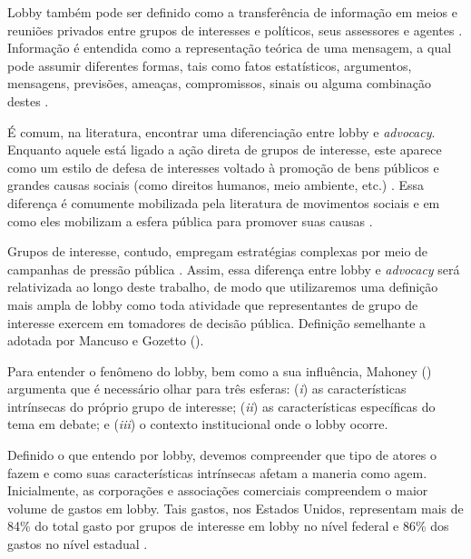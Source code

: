 Lobby também pode ser definido como a transferência de informação em meios e reuniões privados entre grupos de interesses e políticos, seus assessores e agentes \cite{de_figueiredo_advancing_2014}. Informação é entendida como a representação teórica de uma mensagem, a qual pode assumir diferentes formas, tais como fatos estatísticos, argumentos, mensagens, previsões, ameaças, compromissos, sinais ou alguma combinação destes \cite{de_figueiredo_advancing_2014}.

É comum, na literatura, encontrar uma diferenciação entre lobby e \textit{advocacy}. Enquanto aquele está ligado a ação direta de grupos de interesse, este aparece como um estilo de defesa de interesses voltado à promoção de bens públicos e grandes causas sociais (como direitos humanos, meio ambiente, etc.) \cite{mancuso2018}. Essa diferença é comumente mobilizada pela literatura de movimentos sociais e em como eles mobilizam a esfera pública para promover suas causas \cite{van2024rise}.

Grupos de interesse, contudo, empregam estratégias complexas  por meio de campanhas de pressão pública \cite{hall2012targeted}. Assim, essa diferença entre lobby e \textit{advocacy} será relativizada ao longo deste trabalho, de modo que utilizaremos uma definição mais ampla de lobby como toda atividade que representantes de grupo de interesse exercem em tomadores de decisão pública. Definição semelhante a adotada por Mancuso e Gozetto (\citeyear{mancuso2018}).

Para entender o fenômeno do lobby, bem como a sua influência, Mahoney (\citeyear{mahoney_lobbying_2007}) argumenta que é necessário olhar para três esferas: (\textit{i}) as características intrínsecas do próprio grupo de interesse; (\textit{ii}) as características específicas do tema em debate; e (\textit{iii}) o contexto institucional onde o lobby ocorre.

Definido o que entendo por lobby, devemos compreender que tipo de atores o fazem e como suas características intrínsecas afetam a maneria como agem. Inicialmente, as corporações e associações comerciais compreendem o maior volume de gastos em lobby. Tais gastos, nos Estados Unidos, representam mais de 84\% do total gasto por grupos de interesse em lobby no nível federal e 86\% dos gastos no nível estadual \cite{de_figueiredo_advancing_2014}.

